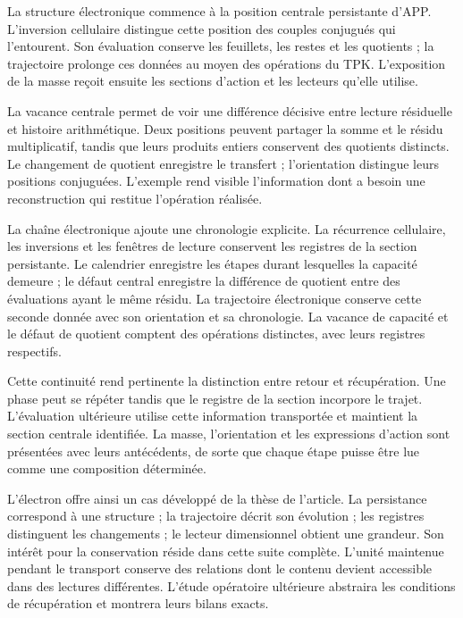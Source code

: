 
La structure électronique commence à la position centrale persistante
d’APP. L’inversion cellulaire distingue cette position des couples
conjugués qui l’entourent. Son évaluation conserve les feuillets, les
restes et les quotients ; la trajectoire prolonge ces données au moyen
des opérations du TPK. L’exposition de la masse reçoit ensuite les
sections d’action et les lecteurs qu’elle utilise.

La vacance centrale permet de voir une différence décisive entre lecture
résiduelle et histoire arithmétique. Deux positions peuvent partager la
somme et le résidu multiplicatif, tandis que leurs produits entiers
conservent des quotients distincts. Le changement de quotient enregistre le
transfert ; l’orientation distingue leurs positions conjuguées.
L’exemple rend visible l’information dont a besoin une reconstruction
qui restitue l’opération réalisée.

La chaîne électronique ajoute une chronologie explicite. La récurrence cellulaire, les inversions et les fenêtres de lecture conservent les registres de la section persistante. Le calendrier enregistre les étapes durant lesquelles la capacité demeure ; le défaut central enregistre la différence de quotient entre des évaluations ayant le même résidu. La trajectoire électronique conserve cette seconde donnée avec son orientation et sa chronologie. La vacance de capacité et le défaut de quotient comptent des opérations distinctes, avec leurs registres respectifs.

Cette continuité rend pertinente la distinction entre retour et
récupération. Une phase peut se répéter tandis que le registre de la
section incorpore le trajet. L’évaluation ultérieure utilise cette
information transportée et maintient la section centrale identifiée.
La masse, l’orientation et les expressions d’action sont présentées avec
leurs antécédents, de sorte que chaque étape puisse être lue comme une
composition déterminée.

L’électron offre ainsi un cas développé de la thèse de l’article.
La persistance correspond à une structure ; la trajectoire décrit
son évolution ; les registres distinguent les changements ; le lecteur
dimensionnel obtient une grandeur. Son intérêt pour la conservation
réside dans cette suite complète. L’unité maintenue pendant
le transport conserve des relations dont le contenu devient accessible
dans des lectures différentes. L’étude opératoire ultérieure abstraira
les conditions de récupération et montrera leurs bilans exacts.
